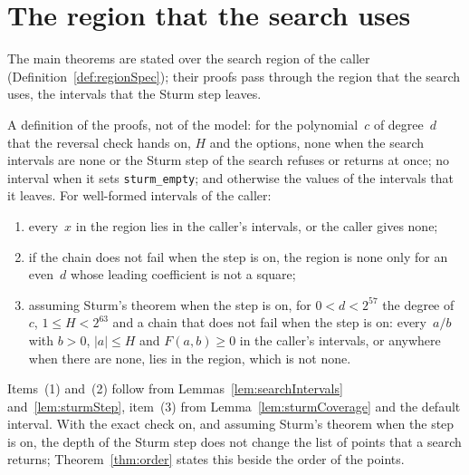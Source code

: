 \section{The region that the search uses}\label{sec:searchRegion}

The main theorems are stated over the search region of the caller
(Definition~\ref{def:regionSpec}); their proofs pass through the region that the search uses, the
intervals that the Sturm step leaves.

\begin{definition}\label{def:searchRegion}
  \leanok
  A definition of the proofs, not of the model: for the polynomial~$c$ of degree~$d$ that the
  reversal check hands on, $H$ and the options, none when the search intervals are none or the
  Sturm step of the search refuses or returns at once; no interval when it sets
  \verb|sturm_empty|; and otherwise the values of the intervals that it leaves. For well-formed
  intervals of the caller:
  \begin{enumerate}
    \item every~$x$ in the region lies in the caller's intervals, or the caller gives none;
    \item if the chain does not fail when the step is on, the region is none only for an even~$d$
      whose leading coefficient is not a square;
    \item assuming Sturm's theorem when the step is on, for $0 < d < 2^{57}$ the degree of~$c$,
      $1 \le H < 2^{63}$ and a chain that does not fail when the step is on: every~$a/b$ with
      $b > 0$, $|a| \le H$ and $F(a, b) \ge 0$ in the caller's intervals, or anywhere when there
      are none, lies in the region, which is not none.
  \end{enumerate}
\end{definition}

Items~(1) and~(2) follow from Lemmas~\ref{lem:searchIntervals} and~\ref{lem:sturmStep}, item~(3)
from Lemma~\ref{lem:sturmCoverage} and the default interval. With the exact check on, and assuming
Sturm's theorem when the step is on, the depth of the Sturm step does not change the list of points
that a search returns; Theorem~\ref{thm:order} states this beside the order of the points.


